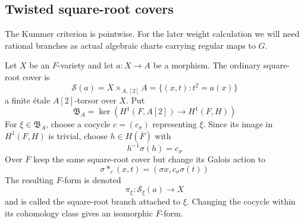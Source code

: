 \documentclass[11pt]{amsart}
\theoremstyle{definition}
\theoremstyle{remark}
\newcommand{\Fb}{\overline F}
\newcommand{\cS}{\mathcal S}
\begin{document}
\subsection{Twisted square-root covers}
The Kummer criterion is pointwise.  For the later weight calculation we will need
rational branches as actual algebraic charts carrying regular maps to
$G$.

Let $X$ be an $F$-variety and let $a:X\to A$ be a morphism.  The ordinary
square-root cover is
\begin{equation}\label{eq:square-root-torsor}
 \cS(a)=X\times_{A,[2]}A
 =\{(x,t):t^2=a(x)\}
\end{equation}
a finite \'etale $A[2]$-torsor over $X$.  Put
\begin{equation}\label{eq:cartan-branch-kernel}
 \mathfrak B_A=
 \ker\left(H^1(F,A[2])\longrightarrow H^1(F,H)\right)
\end{equation}
For $\xi\in\mathfrak B_A$, choose a cocycle $c=(c_\sigma)$ representing
$\xi$.  Since its image in $H^1(F,H)$ is trivial, choose $h\in H(\Fb)$ with
\[
 h^{-1}\sigma(h)=c_\sigma
\]
Over $\Fb$ keep the same square-root cover but change its Galois action to
\begin{equation}\label{eq:twisted-square-root-action}
 \sigma *_c(x,t)=(\sigma x,c_\sigma\sigma(t))
\end{equation}
The resulting $F$-form is denoted
\[
 \pi_\xi:\cS_\xi(a)\longrightarrow X
\]
and is called the square-root branch attached to $\xi$.  Changing the cocycle
within its cohomology class gives an isomorphic $F$-form.
\end{document}
